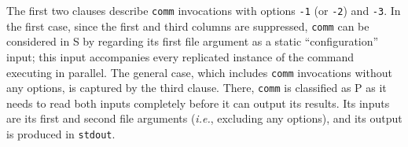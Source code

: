 \documentclass[letterpaper,twocolumn,10pt]{article}
\newcommand{\ie}{{\em i.e.}, }
\newcommand{\ttt}[1]{\texttt{#1}}
\newcommand{\cn}[1]{\mbox{\textcircled{\footnotesize #1}}}
\newcommand{\sta}{\cn{\textsc{S}}\xspace}
\newcommand{\pur}{\cn{\textsc{P}}\xspace}
\newcommand{\kk}[1]{[{\color{magenta}kk: #1}]}
\begin{document}
\noindent
The first two clauses describe \ttt{comm} invocations with options \ttt{-1} (or \ttt{-2}) and \ttt{-3}.
In the first case, since the first and third columns are suppressed, \ttt{comm} can be considered in \sta by regarding its first file argument as a static ``configuration'' input;
  this input accompanies every replicated instance of the command executing in parallel.
The general case, which includes \ttt{comm} invocations without any options, is captured by the third clause.
There, \ttt{comm} is classified as \pur as it needs to %
  read both inputs completely before it can output its results.
Its inputs are its first and second file arguments (\ie excluding any options), and its output is produced in \ttt{stdout}.




\end{document}
